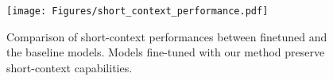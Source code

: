 



\begin{figure}
    \centering
    \texttt{[image: Figures/short\_context\_performance.pdf]}
    \caption{Comparison of short-context performances between finetuned and the baseline models. Models fine-tuned with our method preserve short-context capabilities.}
    \label{fig:short_performance}
\end{figure}


